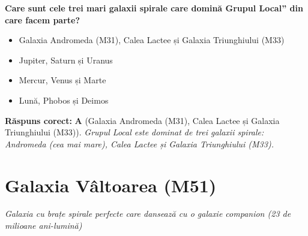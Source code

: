 \vspace{6pt}
\begin{tcolorbox}[orbitarquiz, title={\textbf{Întrebare de verificare \#72: Galaxia Triunghiului (M33)}}]
\textbf{Care sunt cele trei mari galaxii spirale care domină \quotedblbase{}Grupul Local\textquotedblright{} din care facem parte?}
\begin{itemize}[leftmargin=2.2em, itemsep=2pt, topsep=4pt]
  \item[$\square$ \textbf{A.}] Galaxia Andromeda (M31), Calea Lactee și Galaxia Triunghiului (M33)
  \item[$\square$ \textbf{B.}] Jupiter, Saturn și Uranus
  \item[$\square$ \textbf{C.}] Mercur, Venus și Marte
  \item[$\square$ \textbf{D.}] Lună, Phobos și Deimos
\end{itemize}
\vspace{2pt}
{\footnotesize\color{orbitarMuted}\textbf{Răspuns corect:} \textbf{A} (Galaxia Andromeda (M31), Calea Lactee și Galaxia Triunghiului (M33)). \emph{Grupul Local este dominat de trei galaxii spirale: Andromeda (cea mai mare), Calea Lactee și Galaxia Triunghiului (M33).}}
\end{tcolorbox}
\clearpage


\section{Galaxia Vâltoarea (M51)}
\label{sec:body-whirlpool_galaxy}
\vspace{-4pt}
{\large\itshape\color{orbitarAccent} Galaxia cu brațe spirale perfecte care dansează cu o galaxie companion (23 de milioane ani-lumină)}\\[4pt]



